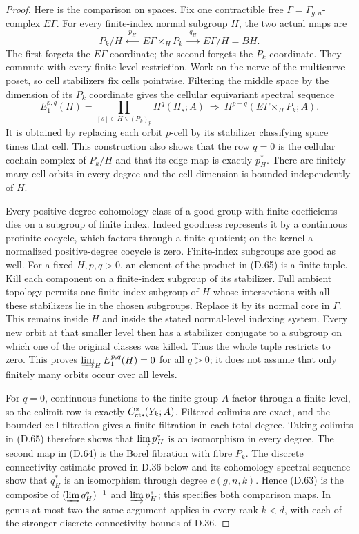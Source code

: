 \begin{proof}
Here is the comparison on spaces.  Fix one contractible free
$\Gamma=\Gamma_{g,n}$-complex $E\Gamma$.  For every finite-index
normal subgroup $H$, the two actual maps are
\[
 P_k/H\ \xleftarrow{\ p_H\ }\ E\Gamma\times_H P_k
                  \ \xrightarrow{\ q_H\ }\ E\Gamma/H=BH.
                                                               \tag{D.64}
\]
The first forgets the $E\Gamma$ coordinate; the second forgets
the $P_k$ coordinate.  They commute with every finite-level
restriction.  Work on the nerve of the multicurve poset, so
cell stabilizers fix cells pointwise.  Filtering the middle space
by the dimension of its $P_k$ coordinate gives the cellular
equivariant spectral sequence
\[
 E_1^{p,q}(H)=
   \prod_{[s]\in H\backslash(P_k)_p}H^q(H_s;A)
      \ \Longrightarrow\ H^{p+q}(E\Gamma\times_H P_k;A).
                                                               \tag{D.65}
\]
It is obtained by replacing each orbit $p$-cell by its stabilizer
classifying space times that cell.  This construction also shows
that the row $q=0$ is the cellular cochain complex of $P_k/H$
and that its edge map is exactly $p_H^*$.  There are finitely
many cell orbits in every degree and the cell dimension is
bounded independently of $H$.

Every positive-degree cohomology class of a good group with
finite coefficients dies on a subgroup of finite index.
Indeed goodness represents it by a continuous profinite
cocycle, which factors through a finite quotient; on the
kernel a normalized positive-degree cocycle is zero.
Finite-index subgroups are good as well.
For a fixed $H,p,q>0$, an element of the product in (D.65)
is a finite tuple.  Kill each component on a finite-index
subgroup of its stabilizer.  Full ambient topology permits
one finite-index subgroup of $H$ whose intersections with all
these stabilizers lie in the chosen subgroups.  Replace it by
its normal core in $\Gamma$.  This remains inside $H$ and
inside the stated normal-level indexing system.  Every new orbit at that smaller level
then has a stabilizer conjugate to a subgroup on which one of
the original classes was killed.  Thus the whole tuple
restricts to zero.  This proves
$\varinjlim_H E_1^{p,q}(H)=0$ for all $q>0$; it does not
assume that only finitely many orbits occur over all levels.

For $q=0$, continuous functions to the finite group $A$ factor
through a finite level, so the colimit row is exactly
$C^*_{\rm cts}(Y_k;A)$.  Filtered colimits are exact, and the
bounded cell filtration gives a finite filtration in each
total degree.  Taking colimits in (D.65) therefore shows that
$\varinjlim p_H^*$ is an isomorphism in every degree.
The second map in (D.64) is the Borel fibration with fibre
$P_k$.  The discrete connectivity estimate proved in D.36
below and its cohomology spectral sequence show that $q_H^*$
is an isomorphism through degree $c(g,n,k)$.  Hence (D.63)
is the composite of $(\varinjlim q_H^*)^{-1}$ and
$\varinjlim p_H^*$; this specifies both comparison maps.
In genus at most two the same argument applies in every
rank $k<d$, with each of the stronger discrete connectivity
bounds of D.36.


\end{proof}

